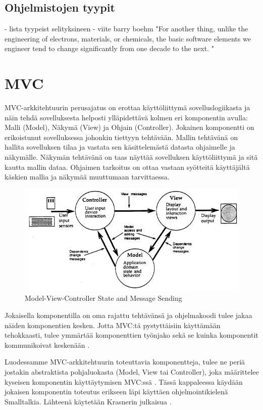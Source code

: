 \documentclass[utf8]{gradu3}
\begin{document}
\section{Ohjelmistojen tyypit}
- lista tyypeist selityksineen
- viite barry boehm "For another thing, unlike the engineering of electrons, materials, or chemicals, the basic software elements we engineer tend to change significantly from one decade to the next. "

\chapter{MVC}
MVC-arkkitehtuurin perusajatus on erottaa käyttöliittymä sovelluslogiikasta ja
näin tehdä sovelluksesta helposti ylläpidettävä kolmen eri komponentin avulla:
Malli (Model), Näkymä (View) ja Ohjain (Controller). Jokainen komponentti on
erikoistunut sovelluksessa johonkin tiettyyn tehtävään. Mallin tehtävänä on
hallita sovelluksen tilaa ja vastata sen käsittelemästä datasta ohjaimelle ja näkymälle.
Näkymän tehtävänä on taas näyttää sovelluksen käyttöliittymä ja sitä kautta mallin dataa. 
Ohjaimen tarkoitus on ottaa vastaan syötteitä käyttäjältä käskien mallia ja näkymää muuttumaan tarvittaessa.

\begin{figure}[h]
\centering
\includegraphics[scale=0.85]{krasner_mvc.jpg}
\caption{Model-View-Controller State and Message Sending \cite[s. 5]{krasner_desc}}
\end{figure} 
Jokaisella komponentilla on oma rajattu tehtävänsä ja ohjelmakoodi tulee jakaa näiden komponentien kesken. Jotta MVC:tä pystyttäisiin käyttämään
tehokkaasti, tulee ymmärtää komponenttien työnjako sekä se kuinka komponentit kommunikoivat keskenään \parencite{burbeck}. 

Luodessamme MVC-arkkitehtuurin toteuttavia komponentteja, tulee ne periä jostakin abstraktista pohjaluokasta (Model, View tai Controller), joka määrittelee kyseisen komponentin käyttäytymisen MVC:ssä  \parencite[s. 5]{krasner_desc}.  Tässä kappaleessa käydään jokaisen komponentin toteutus erikseen läpi käyttäen ohjelmointikielenä Smalltalkia. Lähteenä käytetään Krasnerin julkaisua \parencite{krasner_desc}.
\end{document}
